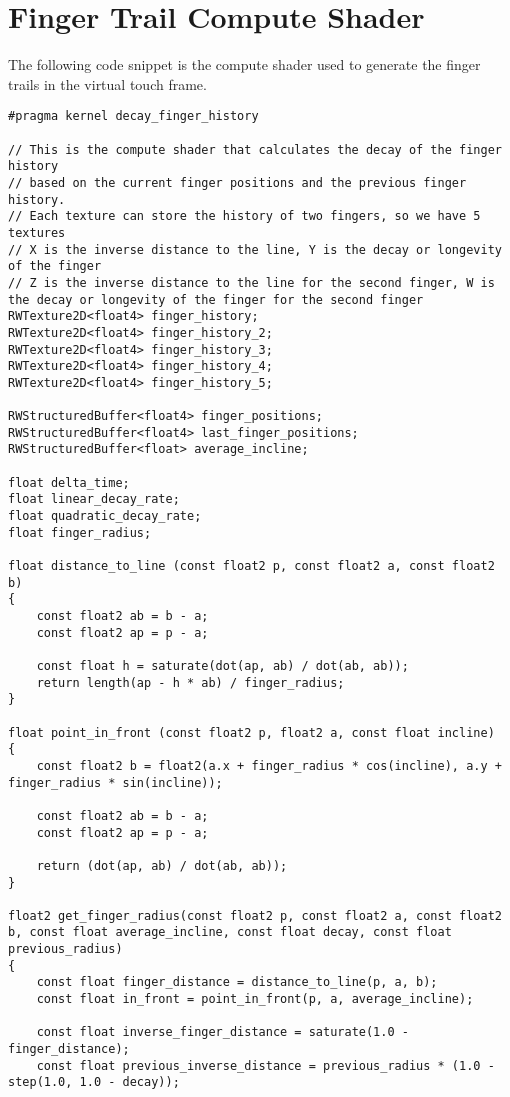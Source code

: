 \chapter{Finger Trail Compute Shader}

The following code snippet is the compute shader used to generate the finger trails in the virtual touch frame.

\begin{lstlisting}[language=HLSL]
#pragma kernel decay_finger_history

// This is the compute shader that calculates the decay of the finger history
// based on the current finger positions and the previous finger history.
// Each texture can store the history of two fingers, so we have 5 textures
// X is the inverse distance to the line, Y is the decay or longevity of the finger
// Z is the inverse distance to the line for the second finger, W is the decay or longevity of the finger for the second finger
RWTexture2D<float4> finger_history;
RWTexture2D<float4> finger_history_2;
RWTexture2D<float4> finger_history_3;
RWTexture2D<float4> finger_history_4;
RWTexture2D<float4> finger_history_5;

RWStructuredBuffer<float4> finger_positions;
RWStructuredBuffer<float4> last_finger_positions;
RWStructuredBuffer<float> average_incline;

float delta_time;
float linear_decay_rate;
float quadratic_decay_rate;
float finger_radius;

float distance_to_line (const float2 p, const float2 a, const float2 b)
{
    const float2 ab = b - a;
    const float2 ap = p - a;

    const float h = saturate(dot(ap, ab) / dot(ab, ab));
    return length(ap - h * ab) / finger_radius;
}

float point_in_front (const float2 p, float2 a, const float incline)
{
    const float2 b = float2(a.x + finger_radius * cos(incline), a.y + finger_radius * sin(incline));

    const float2 ab = b - a;
    const float2 ap = p - a;

    return (dot(ap, ab) / dot(ab, ab));
}

float2 get_finger_radius(const float2 p, const float2 a, const float2 b, const float average_incline, const float decay, const float previous_radius)
{
    const float finger_distance = distance_to_line(p, a, b);
    const float in_front = point_in_front(p, a, average_incline);

    const float inverse_finger_distance = saturate(1.0 - finger_distance);
    const float previous_inverse_distance = previous_radius * (1.0 - step(1.0, 1.0 - decay));


\end{lstlisting}
